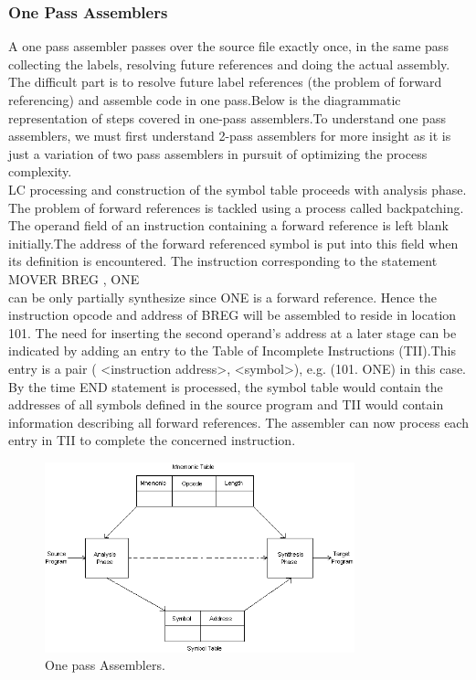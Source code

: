 \documentclass[12pt]{article}
\begin{document}
\subsubsection{One Pass Assemblers}
A one pass assembler passes over the source file exactly once, in the same pass collecting the labels, resolving future references and doing the actual assembly. The difficult part is to resolve future label references (the problem of forward referencing) and assemble code in one pass.Below is the diagrammatic representation of steps covered in one-pass assemblers.To understand one pass assemblers, we must first understand 2-pass assemblers for more insight as it is just a variation of two pass assemblers in pursuit of optimizing the process complexity.\\LC processing and construction of the symbol table proceeds with analysis phase.
The problem of forward references is tackled using a process called backpatching. The
operand field of an instruction containing a forward reference is left blank initially.The address of the forward referenced symbol is put into this field when its definition is
encountered. The instruction corresponding to the statement\\MOVER BREG , ONE \\can be only partially synthesize since ONE is a forward reference. Hence the instruction
opcode and address of BREG will be assembled to reside in location 101. The need for
inserting the second operand’s address at a later stage can be indicated by adding an entry
to the Table of Incomplete Instructions (TII).This entry is a pair ( <instruction
address>, <symbol>), e.g. (101. ONE) in this case.\\By the time END statement is processed, the symbol table would contain the addresses of
all symbols defined in the source program and TII would contain information describing
all forward references. The assembler can now process each entry in TII to complete the
concerned instruction.
\begin{figure}[!htb]
\centering
\includegraphics[width=0.8\textwidth]{one_pass.png}
\caption{\label{fig:one_pass}One pass Assemblers.}
\end{figure}
\end{document}
